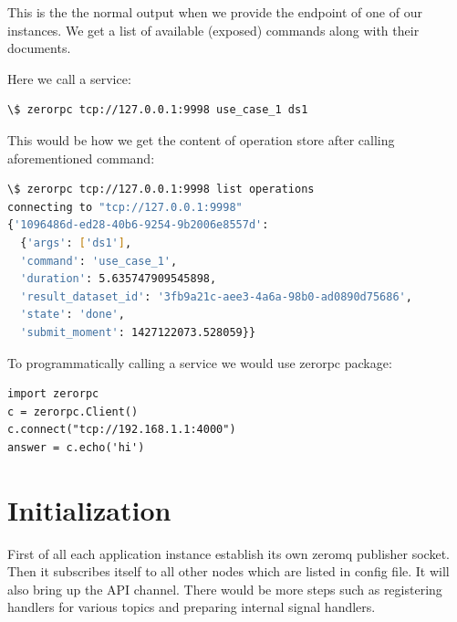 This is the the normal output when we provide the endpoint of one of our instances. 
We get a list of available (exposed) commands along with their documents.

Here we call a service:
\begin{lstlisting}[language=sh, caption={Running an operation on a dataset}]
\$ zerorpc tcp://127.0.0.1:9998 use_case_1 ds1
\end{lstlisting}

This would be how we get the content of operation store after calling aforementioned command:

\begin{lstlisting}[language=sh, caption={Running an operation from command line}]
\$ zerorpc tcp://127.0.0.1:9998 list operations
connecting to "tcp://127.0.0.1:9998"
{'1096486d-ed28-40b6-9254-9b2006e8557d': 
  {'args': ['ds1'],
  'command': 'use_case_1',
  'duration': 5.635747909545898,
  'result_dataset_id': '3fb9a21c-aee3-4a6a-98b0-ad0890d75686',
  'state': 'done',
  'submit_moment': 1427122073.528059}}
\end{lstlisting}

To programmatically calling a service we would use zerorpc package:

\begin{lstlisting}[caption={Connecting to an API endpoint in ZeroRPC}]
import zerorpc
c = zerorpc.Client()
c.connect("tcp://192.168.1.1:4000")
answer = c.echo('hi')
\end{lstlisting}


\section{Initialization}
First of all each application instance establish its own zeromq publisher socket. Then it subscribes
itself to all other nodes which are listed in config file. It will also bring up the API channel.
There would be more steps such as registering handlers for various topics and preparing internal
signal handlers.
